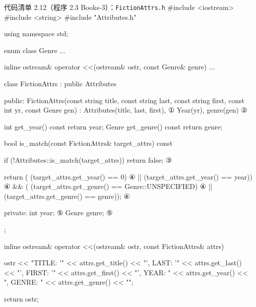 \begin{codeboxt}{代码清单 2.12（程序 2.3 Books-3）：\texttt{Fiction\allowbreak{}Attrs.\allowbreak{}h}}
#include <iostream>
#include <string>
#include "Attributes.h"

using namespace std;

enum class Genre ...

inline ostream& operator <<(ostream& ostr, const Genre& genre) ...

class FictionAttrs : public Attributes
{
public:
    FictionAttrs(const string title,
                 const string last, const string first,
                 const int yr, const Genre gen)
        : Attributes(title, last, first),                             ①
          Year(yr), genre(gen) {}                                     ②

    int   get_year()  const { return year; }
    Genre get_genre() const { return genre; }

    bool is_match(const FictionAttrs& target_attrs) const
    {
        if (!Attributes::is_match(target_attrs)) return false;        ③

        return (   (target_attrs.get_year()  == 0)                    ④
                || (target_attrs.get_year()  == year))                ④
            && (   (target_attrs.get_genre() == Genre::UNSPECIFIED)   ④
                || (target_attrs.get_genre() == genre));              ④
    }

private:
    int   year;                                                       ⑤
    Genre genre;                                                      ⑤
};

inline ostream& operator <<(ostream& ostr, const FictionAttrs& attrs)
{
    ostr << "{TITLE: '"   << attrs.get_title()
         << "', LAST: '"  << attrs.get_last()
         << "', FIRST: '" << attrs.get_first()
         << "', YEAR: "   << attrs.get_year()
         << ", GENRE: "   << attrs.get_genre() << "}";

    return ostr;
}
\end{codeboxt}
\par
{}\par
{}\par
{}\par
{}\par

